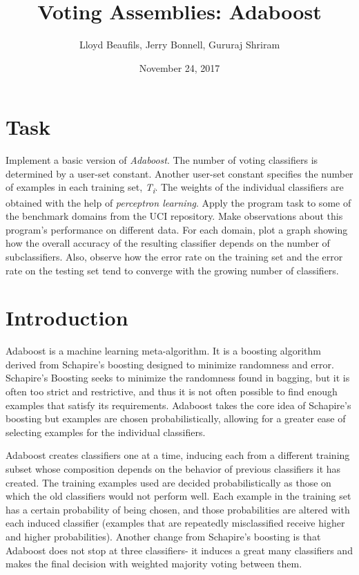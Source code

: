 \documentclass{article}
\title{Voting Assemblies: Adaboost}
\author{Lloyd Beaufils, Jerry Bonnell, Gururaj Shriram}
\date{November 24, 2017}
\begin{document}
\maketitle

\section{Task}

Implement a basic version of \textit{Adaboost}. The number of voting classifiers is determined by a user-set constant. Another user-set constant specifies the number of examples in each training set, \textit{T\textsubscript{i}}. The weights of the individual classifiers are obtained with the help of \textit{perceptron learning}. Apply the program task to some of the benchmark domains from the UCI repository. Make observations about this program's performance on different data. For each domain, plot a graph showing how the overall accuracy of the resulting classifier depends on the number of subclassifiers. Also, observe how the error rate on the training set and the error rate on the testing set tend to converge with the growing number of classifiers.

\section{Introduction}

Adaboost is a machine learning meta-algorithm. It is a boosting algorithm derived from Schapire's boosting designed to minimize randomness and error. Schapire's Boosting seeks to minimize the randomness found in bagging, but it is often too strict and restrictive, and thus it is not often possible to find enough examples that satisfy its requirements. Adaboost takes the core idea of Schapire's boosting but examples are chosen probabilistically, allowing for a greater ease of selecting examples for the individual classifiers.

Adaboost creates classifiers one at a time, inducing each from a different training subset whose composition depends on the behavior of previous classifiers it has created. The training examples used are decided probabilistically as those on which the old classifiers would not perform well. Each example in the training set has a certain probability of being chosen, and those probabilities are altered with each induced classifier (examples that are repeatedly misclassified receive higher and higher probabilities). Another change from Schapire's boosting is that Adaboost does not stop at three classifiers- it induces a great many classifiers and makes the final decision with weighted majority voting between them.
\end{document}
